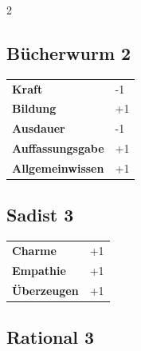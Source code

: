 \begin{multicols}{2}
\begin{tcolorbox}
\end{tcolorbox}

\begin{tcolorbox}
    \subsection*{Bücherwurm \hfill \small{2 }}
    \tcblower




\begin{tabular}{@{}ll@{}}
    \textbf{Kraft} & -1\\
    \textbf{Bildung} & +1\\
    \textbf{Ausdauer} & -1\\
    \textbf{Auffassungsgabe} & +1\\
    \textbf{Allgemeinwissen} & +1\\
\end{tabular}


\end{tcolorbox}

\begin{tcolorbox}
    \subsection*{Sadist \hfill \small{3 }}
    \tcblower




\begin{tabular}{@{}ll@{}}
    \textbf{Charme} & +1\\
    \textbf{Empathie} & +1\\
    \textbf{Überzeugen} & +1\\
\end{tabular}


\end{tcolorbox}

\begin{tcolorbox}
    \subsection*{Rational \hfill \small{3 }}
    \tcblower





\end{tcolorbox}
\end{multicols}
